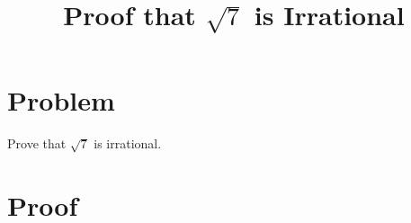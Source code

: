 \documentclass{article}
\title{Proof that $\sqrt{7}$ is Irrational}
\author{}
\date{}
\theoremstyle{plain}
\begin{document}
\maketitle

\section*{Problem}

Prove that $\sqrt{7}$ is irrational.

\section*{Proof}


\end{document}
